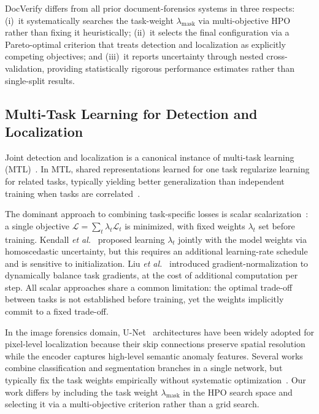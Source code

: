 DocVerify differs from all prior document-forensics systems in three respects:
(i)~it systematically searches the task-weight $\lambda_{\text{mask}}$ via
multi-objective HPO rather than fixing it heuristically; (ii)~it selects the
final configuration via a Pareto-optimal criterion that treats detection and
localization as explicitly competing objectives; and (iii)~it reports
uncertainty through nested cross-validation, providing statistically rigorous
performance estimates rather than single-split results.

\subsection{Multi-Task Learning for Detection and Localization}

Joint detection and localization is a canonical instance of multi-task learning
(MTL)~\cite{caruana1997multitask, ruder2017overview}. In MTL, shared representations
learned for one task regularize learning for related tasks, typically yielding better
generalization than independent training when tasks are correlated~\cite{crawshaw2020multi}.

The dominant approach to combining task-specific losses is scalar
scalarization~\cite{marler2004survey}: a single objective $\mathcal{L} = \sum_t
\lambda_t \mathcal{L}_t$ is minimized, with fixed weights $\lambda_t$ set before
training. Kendall \textit{et al.}~\cite{kendall2018multi} proposed learning $\lambda_t$
jointly with the model weights via homoscedastic uncertainty, but this requires an
additional learning-rate schedule and is sensitive to initialization. Liu \textit{et al.}~\cite{liu2019end}
introduced gradient-normalization to dynamically balance task gradients, at the cost
of additional computation per step. All scalar approaches share a common limitation:
the optimal trade-off between tasks is not established before training, yet the
weights implicitly commit to a fixed trade-off.

In the image forensics domain, U-Net~\cite{unet2015} architectures have been widely
adopted for pixel-level localization because their skip connections preserve spatial
resolution while the encoder captures high-level semantic anomaly features. Several
works combine classification and segmentation branches in a single network, but
typically fix the task weights empirically without systematic
optimization~\cite{wu2022robust}. Our work differs by including the task weight
$\lambda_{\text{mask}}$ in the HPO search space and selecting it via a
multi-objective criterion rather than a grid search.


